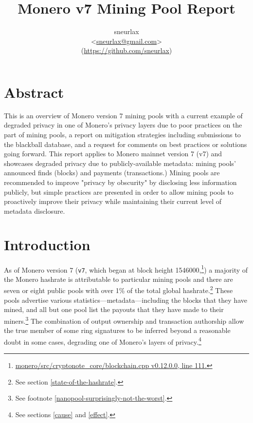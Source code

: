\documentclass[notitlepage]{report}
\title{Monero v7 Mining Pool Report}
\author{sneurlax \\
\textless\url{sneurlax@gmail.com}\textgreater \\
(\url{https://github.com/sneurlax})}
\begin{document}
\maketitle
\thispagestyle{empty}

\section*{Abstract}

This is an overview of Monero version 7 mining pools with a current example of degraded privacy in one of Monero's privacy layers due to poor practices on the part of mining pools, a report on mitigation strategies including submissions to the blackball database, and a request for comments on best practices or solutions going forward.  This report applies to Monero mainnet version 7 (v7) and showcases degraded privacy due to publicly-available metadata: mining pools' announced finds (blocks) and payments (transactions.)  Mining pools are recommended to improve "privacy by obscurity" by disclosing less information publicly, but simple practices are presented in order to allow mining pools to proactively improve their privacy while maintaining their current level of metadata disclosure.

\clearpage

\tableofcontents

\section{Introduction}

\setcounter{page}{1}

As of Monero version 7 (\verb/v7/, which began at block height 1546000,\footnote{\href{https://github.com/monero-project/monero/blob/93e76e14a205a84cbea8ab0a3e35f37bf9d08b42/src/cryptonote_core/blockchain.cpp\#L111}{monero/src/cryptonote\_core/blockchain.cpp v0.12.0.0, line 111.}}) a majority of the Monero hashrate is attributable to particular mining pools and there are seven or eight public pools with over 1\% of the total global hashrate.\footnote{See section \ref{state-of-the-hashrate}.}  These pools advertise various statistics---metadata---including the blocks that they have mined, and all but one pool list the payouts that they have made to their miners.\footnote{See footnote \ref{nanopool-surprisingly-not-the-worst}.}  The combination of output ownership and transaction authorship allow the true member of some ring signatures to be inferred beyond a reasonable doubt in some cases, degrading one of Monero's layers of privacy.\footnote{See sections \ref{cause} and \ref{effect}.}
\end{document}
